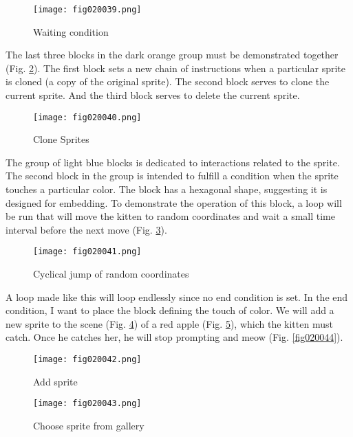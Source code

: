 \begin{figure}[H]
   \centering
   \texttt{[image: fig020039.png]}
   \caption{Waiting condition}
\label{fig020039}
\end{figure}

The last three blocks in the dark orange group must be demonstrated together (Fig. \ref{fig020040}). The first block sets a new chain of instructions when a particular sprite is cloned (a copy of the original sprite). The second block serves to clone the current sprite. And the third block serves to delete the current sprite.

\begin{figure}[H]
   \centering
   \texttt{[image: fig020040.png]}
   \caption{Clone Sprites}
\label{fig020040}
\end{figure}

The group of light blue blocks is dedicated to interactions related to the sprite. The second block in the group is intended to fulfill a condition when the sprite touches a particular color. The block has a hexagonal shape, suggesting it is designed for embedding. To demonstrate the operation of this block, a loop will be run that will move the kitten to random coordinates and wait a small time interval before the next move (Fig. \ref{fig020041}).

\begin{figure}[H]
   \centering
   \texttt{[image: fig020041.png]}
   \caption{Cyclical jump of random coordinates}
\label{fig020041}
\end{figure}

A loop made like this will loop endlessly since no end condition is set. In the end condition, I want to place the block defining the touch of color. We will add a new sprite to the scene (Fig. \ref{fig020042}) of a red apple (Fig. \ref{fig020043}), which the kitten must catch. Once he catches her, he will stop prompting and meow (Fig. \ref{fig020044}).

\begin{figure}[H]
   \centering
   \texttt{[image: fig020042.png]}
   \caption{Add sprite}
\label{fig020042}
\end{figure}

\begin{figure}[H]
   \centering
   \texttt{[image: fig020043.png]}
   \caption{Choose sprite from gallery}
\label{fig020043}
\end{figure}

